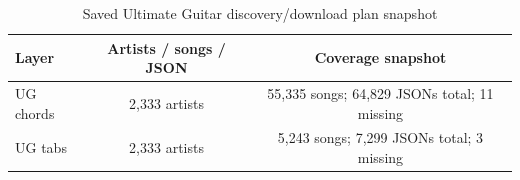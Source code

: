 \begin{table}[H]
\centering
\caption{Saved Ultimate Guitar discovery/download plan snapshot}
\label{tab:ug_plan}
\begin{tabular}{lcc}
\toprule
Layer & Artists / songs / JSON & Coverage snapshot \\
\midrule
UG chords & 2,333 artists & 55,335 songs; 64,829 JSONs total; 11 missing \\
UG tabs & 2,333 artists & 5,243 songs; 7,299 JSONs total; 3 missing \\
\bottomrule
\end{tabular}
\end{table}
